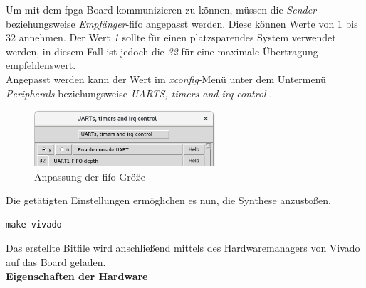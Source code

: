 Um mit dem \ac{fpga}-Board kommunizieren zu können, müssen die \emph{Sender}- beziehungsweise \emph{Empfänger}-\ac{fifo} angepasst werden. Diese können Werte von 1 bis 32 annehmen.
Der Wert \emph{1} sollte für einen platzsparendes System verwendet werden, in diesem Fall ist jedoch die \emph{32} für eine maximale Übertragung empfehlenswert.\\
Angepasst werden kann der Wert im \emph{xconfig}-Menü unter dem Untermenü \emph{Peripherals} beziehungsweise \glqq \emph{UARTS, timers and irq control} \grqq{}.\\

\begin{figure}[H]
\centering
\includegraphics[width=0.6\textwidth]{Hauptteil/fifodepth.png}
\caption{Anpassung der \ac{fifo}-Größe}
\label{fig:fifodepth}
\end{figure}




Die getätigten Einstellungen ermöglichen es nun, die Synthese anzustoßen.\\

\begin{lstlisting}[caption={Aufruf des Vivado-Programm },label={code:vivado}]
make vivado
   \end{lstlisting}






Das erstellte Bitfile wird anschließend mittels des Hardwaremanagers von Vivado auf das Board geladen.\\



\textbf{Eigenschaften der Hardware}\\

